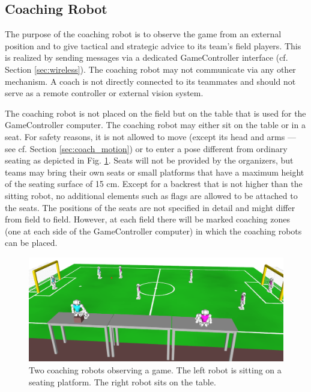 \documentclass[12pt]{article}
\newcommand{\cf}{\mbox{cf.}\xspace}
\begin{document}
\subsection{Coaching Robot}
\label{sec:coaching_robot}

The purpose of the coaching robot is to observe the game from an external position and to give tactical and strategic advice to its team's field players. This is realized by sending messages via a dedicated GameController interface (\cf Section \ref{sec:wireless}). The coaching robot may not communicate via any other mechanism.  A coach is not directly connected to its teammates and should not serve as a remote controller or external vision system.

The coaching robot is not placed on the field but on the table that is used for the GameController computer. The coaching robot may either sit on the table or in a seat. For safety reasons, it is not allowed to move (except its head and arms --- see \cf Section \ref{sec:coach_motion}) or to enter a pose different from ordinary seating as depicted in Fig. \ref{fig:coaches}.  Seats will not be provided by the organizers, but teams may bring their own seats or small platforms that have a maximum height of the seating surface of 15 cm. Except for a backrest that is not higher than the sitting robot, no additional elements such as flags are allowed to be attached to the seats. The positions of the seats are not specified in detail and might differ from field to field. However, at each field there will be marked coaching zones (one at each side of the GameController computer) in which the coaching robots can be placed.

\begin{figure}[t]
\centerline{\includegraphics[width=\columnwidth]{figs/coaching-robots}}
\caption{Two coaching robots observing a game. The left robot is sitting on a seating platform. The right robot sits on the table.}
\label{fig:coaches}
\end{figure}
 
\end{document}

